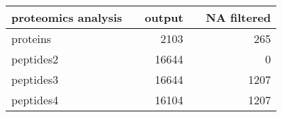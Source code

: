 \begin{table}[]
\begin{tabular}{lrrrr}
proteomics analysis                                                                                                                    &           & output &              & NA filtered              \\
\hline
proteins                                                                                                                               &           & 2103   &              & 265                      \\
peptides2                                                                                                                              &           & 16644  &              & 0                        \\
peptides3                                                                                                                              &           & 16644  &              & 1207                     \\
peptides4                                                                                                                              &           & 16104  &              & 1207                    
\end{tabular}
\end{table}


